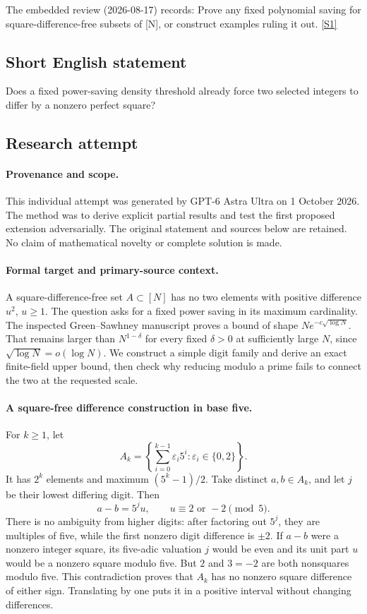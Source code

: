 \documentclass[11pt,a4paper]{article}
\newcommand{\sref}[2]{\hyperlink{source:#1:#2}{[S#2]}}
\begin{document}
The embedded review (2026-08-17) records: Prove any fixed polynomial saving for square-difference-free subsets of [N], or construct examples ruling it out. \sref{statement}{1}

\subsection{Short English statement}

Does a fixed power-saving density threshold already force two selected integers to differ by a nonzero perfect square?

\subsection{Research attempt}

\paragraph{Provenance and scope.}
This individual attempt was generated by GPT-6 Astra Ultra on 1 October 2026. The method was to derive explicit partial results and test the first proposed extension adversarially. The original statement and sources below are retained. No claim of mathematical novelty or complete solution is made.

\paragraph{Formal target and primary-source context.}
A square-difference-free set $A\subset[N]$ has no two elements with positive difference $u^2$, $u\geq1$. The question asks for a fixed power saving in its maximum cardinality. The inspected Green--Sawhney manuscript proves a bound of shape $Ne^{-c\sqrt{\log N}}$. That remains larger than $N^{1-\delta}$ for every fixed $\delta>0$ at sufficiently large $N$, since $\sqrt{\log N}=o(\log N)$. We construct a simple digit family and derive an exact finite-field upper bound, then check why reducing modulo a prime fails to connect the two at the requested scale.

\paragraph{A square-free difference construction in base five.}
For $k\geq1$, let
\[
 A_k=\left\{\sum_{i=0}^{k-1}\varepsilon_i5^i:\varepsilon_i\in\{0,2\}\right\}.
\]
It has $2^k$ elements and maximum $(5^k-1)/2$. Take distinct $a,b\in A_k$, and let $j$ be their lowest differing digit. Then
\[
 a-b=5^j u,\qquad u\equiv2\text{ or }-2\pmod5.
\]
There is no ambiguity from higher digits: after factoring out $5^j$, they are multiples of five, while the first nonzero digit difference is $\pm2$. If $a-b$ were a nonzero integer square, its five-adic valuation $j$ would be even and its unit part $u$ would be a nonzero square modulo five. But $2$ and $3=-2$ are both nonsquares modulo five. This contradiction proves that $A_k$ has no nonzero square difference of either sign. Translating by one puts it in a positive interval without changing differences.
\end{document}
